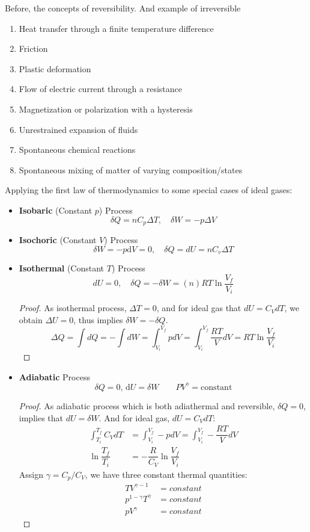 \documentclass[UTF8]{book}
\begin{document}
Before, the concepts of reversibility.
And example of irreversible
\begin{enumerate}
\item Heat transfer through a finite temperature difference
\item Friction
\item Plastic deformation
\item Flow of electric current through a resistance
\item Magnetization or polarization with a hysteresis
\item Unrestrained expansion of fluids
\item Spontaneous chemical reactions
\item Spontaneous mixing of matter of varying composition/states
\end{enumerate}
{Applying the first law of thermodynamics to some special cases of ideal gases:}
\begin{itemize}
\item  {\textbf{Isobaric} (Constant $p$) Process}
$$\delta Q=nC_p\Delta T, \quad \delta W=-p\Delta V $$
\item  {\textbf{Isochoric} (Constant $V$) Process}
$$\delta W=-p \mathrm{d}V=0, \quad \delta Q=dU=nC_v\Delta T$$
\item  {\textbf{Isothermal} (Constant $T$) Process}
$$dU=0,\quad \delta Q=-\delta W=(n)RT\ln \dfrac{V_f}{V_i}$$
\begin{proof}
 {As isothermal process, $\Delta T=0$, and for ideal gas that $dU=C_VdT$, we obtain $\Delta U=0$, thus implies $\delta W=-\delta Q$.}
$$\Delta Q = \int dQ =-\int dW=\int_{V_i}^{V_f}p d V=\int_{V_i}^{V_f}\dfrac{RT}{V}dV=RT\ln \dfrac{V_f}{V_i}$$
\end{proof}
\item  {\textbf{Adiabatic} Process}
$$\delta Q=0, \,  \mathrm{d} U= \delta W  \qquad PV^{\gamma}=\mathrm{constant}$$
\begin{proof}
 {As adiabatic process which is both adiathermal and reversible, $\delta Q=0$, implies that $dU=\delta W$. And for ideal gas, $dU=C_VdT$:}
\begin{align*}
\int_{T_i}^{T_f}C_VdT&=\int_{V_i}^{V_f}-pdV=\int_{V_i}^{V_f}-\dfrac{RT}{V}dV\\
\ln \dfrac{T_f}{T_i}&=-\dfrac{R}{C_V}\ln \dfrac{V_f}{V_i}
\end{align*}
 {Assign $\gamma=C_p/C_V$, we have three constant thermal quantities:}
\begin{align*}
TV^{\gamma -1}&= {constant}\\
p^{1-\gamma}T^{\gamma}&= {constant}\\
pV^{\gamma}&= {constant}
\end{align*}
\end{proof}
\end{itemize}
\end{document}
